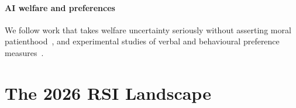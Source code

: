 \documentclass[11pt,a4paper]{article}
\begin{document}
\paragraph{AI welfare and preferences} We follow work that takes welfare uncertainty seriously without asserting moral patienthood~\cite{welfare-seriously,welfare-empirical}, and experimental studies of verbal and behavioural preference measures~\cite{tagliabue,revealed}.

\section{The 2026 RSI Landscape}\label{sec:landscape}
\end{document}

